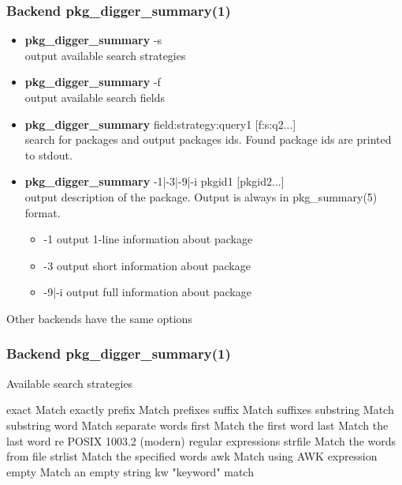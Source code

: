 \documentclass[hyperref=unicode,ascii,xcolor=dvipsnames]{beamer}
\begin{document}
\begin{frame}[fragile]
  \frametitle{Backend pkg\_digger\_summary(1)}
  \begin{itemize}
  \item {\bf pkg\_digger\_summary} -s\\
    output available search strategies
  \item {\bf pkg\_digger\_summary} -f\\
    output available search fields
  \item {\bf pkg\_digger\_summary} field:strategy:query1 [f:s:q2...]\\
    search for packages and output packages ids.
    Found package ids are printed to stdout.
  \item {\bf pkg\_digger\_summary} -1|-3|-9|-i pkgid1 [pkgid2...]\\
    output description of the package. Output is always in pkg\_summary(5) format.
    \begin{itemize}
    \item -1         output 1-line information about package
    \item -3         output short information about package
    \item -9|-i      output full information about package
    \end{itemize}
  \end{itemize}
  Other backends have the same options
\end{frame}


\begin{frame}[fragile]
  \frametitle{Backend pkg\_digger\_summary(1)}
  \begin{block}{Available search strategies}
    \begin{Code}{}
exact   Match exactly
prefix  Match prefixes
suffix  Match suffixes
substring       Match substring
word    Match separate words
first   Match the first word
last    Match the last word
re      POSIX 1003.2 (modern) regular expressions
strfile Match the words from file
strlist Match the specified words
awk     Match using AWK expression
empty   Match an empty string
kw      "keyword" match
\prompt{#}
    \end{Code}
  \end{block}
\end{frame}

\end{document}
